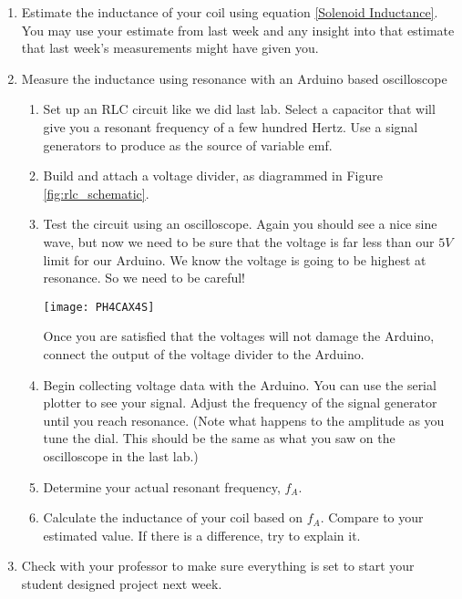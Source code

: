 \clearpage
\activity
{

\begin{enumerate}
\item Estimate the inductance of your coil using equation \ref{Solenoid
Inductance}. You may use your estimate from last week and any insight into
that estimate that last week's measurements might have given you.

\item Measure the inductance using resonance with an Arduino based
oscilloscope

\begin{enumerate}
\item Set up an RLC circuit like we did last lab. Select a capacitor that will
give you a resonant frequency of a few hundred Hertz.
Use a signal generators to produce as the source of variable emf. 

\item Build and attach a voltage divider, as diagrammed in Figure 
\ref{fig:rlc_schematic}. 

\item Test the circuit using an oscilloscope. Again you should see a nice
sine wave, but now we need to be sure that the voltage is far less than our $%
5\unit{V}$ limit for our Arduino. We know the voltage is going to be highest
at resonance. So we need to be careful!
\begin{center}
\texttt{[image: PH4CAX4S]}
\end{center}
Once you are satisfied that the voltages will not damage the Arduino, connect
the output of the voltage divider to the Arduino.

\item Begin collecting voltage data with the Arduino. You can use the serial
plotter to see your signal. 
Adjust the frequency of the signal generator until you reach resonance.
(Note what happens to the amplitude as you tune the dial. This
should be the same as what you saw on the oscilloscope in the last lab.)

\item Determine your actual resonant frequency, $f_{A}$.

\item Calculate the inductance of your coil based on $f_{A}$. Compare to
your estimated value. If there is a difference, try to explain it.
\end{enumerate}

\item Check with your professor to make sure everything is set to start your
student designed project next week.
\end{enumerate}
}
